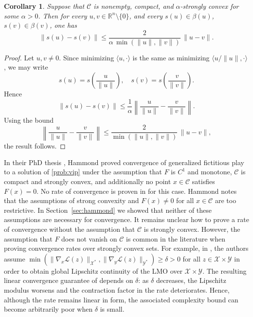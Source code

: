 \documentclass[pdflatex,sn-mathphys-num]{sn-jnl}%
\newcommand\R{\mathbb{R}}
\newcommand\C{\mathcal{C}}
\newcommand\X{\mathcal{X}}
\newcommand\Y{\mathcal{Y}}
\renewcommand\L{\mathcal{L}}
\theoremstyle{thmstyleone}%
\newtheorem{corollary}[theorem]{Corollary}%
\theoremstyle{thmstyletwo}%
\theoremstyle{thmstylethree}%
\begin{document}
\begin{corollary} \label{cor:lmo-lip}
  Suppose that $\C$ is nonempty, compact, and $\alpha$-strongly convex for some $\alpha > 0$. Then for every $u,v \in \R^n\setminus\{0\}$, and every
  $s(u) \in \beta(u)$, $s(v) \in \beta(v)$, one has
  \[
    \|s(u)-s(v)\| \leq \frac{2}{\alpha\,\min(\|u\|,\|v\|)}\,\|u-v\|.
  \]
\end{corollary}
\begin{proof}
  Let $u,v\neq 0$. Since minimizing $\langle u,\cdot\rangle$ is the same as minimizing
  $\langle u/\|u\|,\cdot\rangle$, we may write
  \[
    s(u)=s\!\left(\frac{u}{\|u\|}\right),\quad s(v)=s\!\left(\frac{v}{\|v\|}\right).
  \]
  Hence
  \[
    \|s(u)-s(v)\| \leq \frac{1}{\alpha} \left\|\frac{u}{\|u\|}-\frac{v}{\|v\|}\right\|.
  \]
  Using the bound
  \[
    \left\|\frac{u}{\|u\|}-\frac{v}{\|v\|}\right\| \leq \frac{2}{\min(\|u\|,\|v\|)}\,\|u-v\|,
  \]
  the result follows.
\end{proof}

In their PhD thesis \cite{Hammond1984}, Hammond proved convergence of generalized fictitious play to a solution of \eqref{prob:vip}
under the assumption that $F$ is $C^1$ and monotone, $\C$ is compact and strongly convex, and additionally no point $x \in \C$
satisfies $F(x) = 0$. No rate of convergence is proven in \cite{Hammond1984} for this case. Hammond notes that the assumptions
of strong convexity and $F(x) \neq 0$ for all $x \in \C$ are too restrictive. In Section~\ref{sec:hammond} we showed that neither
of these assumptions are necessary for convergence. It remains unclear how to prove a rate of convergence without the assumption
that $\C$ is strongly convex. However, the assumption that $F$ does not vanish on $\C$ is common in the literature
when proving convergence rates over strongly convex sets. For example, in \cite{Gidel2017}, the authors assume
$\min\left(\|\nabla_x \L(z)\|_{\X^*}, \|\nabla_y \L(z)\|_{\Y^*}\right) \geq \delta > 0$ for all $z \in \X\times\Y$ in order to
obtain global Lipschitz continuity of the LMO over $\X \times \Y$. The resulting linear convergence guarantee of \cite[Theorem~4]{Gidel2017}
depends on $\delta$: as $\delta$ decreases, the Lipschitz modulus worsens and the contraction factor in the rate deteriorates. Hence,
although the rate remains linear in form, the associated complexity bound can become arbitrarily poor when $\delta$ is small.
\end{document}
